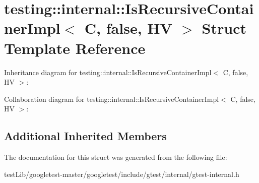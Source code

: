 \hypertarget{structtesting_1_1internal_1_1IsRecursiveContainerImpl_3_01C_00_01false_00_01HV_01_4}{}\section{testing\+:\+:internal\+:\+:Is\+Recursive\+Container\+Impl$<$ C, false, HV $>$ Struct Template Reference}
\label{structtesting_1_1internal_1_1IsRecursiveContainerImpl_3_01C_00_01false_00_01HV_01_4}


Inheritance diagram for testing\+:\+:internal\+:\+:Is\+Recursive\+Container\+Impl$<$ C, false, HV $>$\+:


Collaboration diagram for testing\+:\+:internal\+:\+:Is\+Recursive\+Container\+Impl$<$ C, false, HV $>$\+:
\subsection*{Additional Inherited Members}


The documentation for this struct was generated from the following file\+:\begin{DoxyCompactItemize}
\item 
test\+Lib/googletest-\/master/googletest/include/gtest/internal/gtest-\/internal.\+h\end{DoxyCompactItemize}
